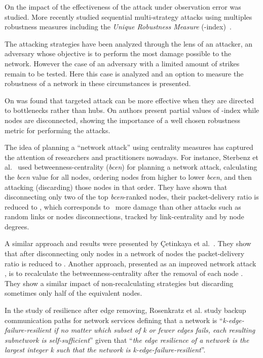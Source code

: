 \documentclass{sig-alternate-10pt}
\begin{document}
On \cite{38booker2012effects} the impact of the effectiveness of the attack under observation error was studied. More recently \cite{ventresca2015network} studied sequential multi-strategy attacks using multiples robustness measures including the \textit{Unique Robustness Measure} (-index)~\cite{schneider2011mitigation}. 


The attacking strategies have been analyzed through the lens of an attacker, an adversary whose objective is to perform the most damage possible to the network. However the case of an adversary with a limited amount of strikes remain to be tested. Here this case is analyzed and an option to measure the robustness of a network in these circumstances is presented.

On \cite{32estrada2006network} was found that targeted attack can be more effective when they are directed to bottlenecks rather than hubs. On \cite{miuz} authors present partial values of -index while nodes are disconnected, showing the importance of a well chosen robustness metric for performing the attacks.

The idea of planning a ``network attack'' using centrality measures has captured the attention of researchers and practitioners nowadays. For instance, Sterbenz et al.~\cite{sterbenz2011modelling} used bet\-ween\-ness-centrality (\textit{bcen}) for planning a network attack, calculating the \textit{bcen} value for all nodes, ordering nodes from higher to lower \textit{bcen}, and then attacking (discarding) those nodes in that order. They have shown that disconnecting only two of the top \textit{bcen}-ranked nodes, their packet-delivery ratio is reduced to , which corresponds to~ more damage than other attacks such as random links or nodes disconnections, tracked by link-centrality and by node degrees.  

A similar approach and results were presented by {\c{C}}etin\-kaya et al.~\cite{ccetinkaya2013modelling}. They show that after disconnecting only  nodes in a network of  nodes the packet-delivery ratio is reduced to . Another approach, presented as an improved network attack \cite{rak2010survivability, sydney2010characterising}, is to recalculate the betweenness-centrality after the removal of each node \cite{holme2002attack,molisz2006end}. They show a similar impact of non-recalculating strategies but discarding sometimes only half of the equivalent nodes. 

In the study of resilience after edge removing, Rosen\-kratz et al. \cite{rosenkrantz2009resilience} study backup communication paths for network services defining that a network is ``\textit{k-edge-failure-resilient if no matter which subset of k or fewer edges fails, each resulting subnetwork is self-sufficient}'' given that ``\textit{the edge resilience of a network is the largest integer k such that the network is k-edge-failure-resilient}''.
\end{document}
